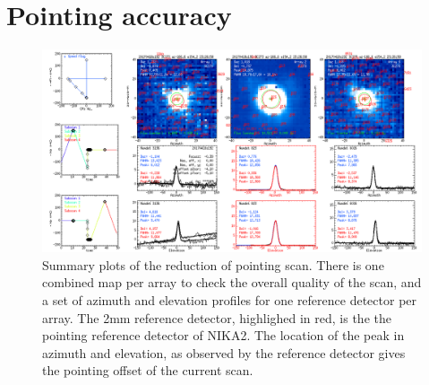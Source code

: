 \section{Pointing accuracy}
\label{se:pointing}

\begin{figure}
\begin{center}
\includegraphics[clip, angle=0, scale = 0.30]{Figures/plot_20170418s192.png}
\caption{Summary plots of the reduction of pointing scan. There is one combined
  map per array to check the overall quality of the scan, and a set of azimuth
  and elevation profiles for one reference detector per array. The 2mm reference
  detector, highlighed in red, is the the pointing reference detector of
  NIKA2. The location of the peak in azimuth and elevation, as observed by the
  reference detector gives the pointing offset of the current scan.}
\label{fig:ptg}
\end{center}
\end{figure}

